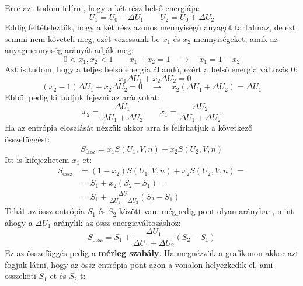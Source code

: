 \documentclass[a4paper,12pt]{article}
\begin{document}
Erre azt tudom felírni, hogy a két rész belső energiája:
\begin{equation}
    U_1 = U_0 - \Delta U_1 \qquad U_2 = U_0 + \Delta U_2
\end{equation}
Eddig feltételeztük, hogy a két rész azonos mennyiségű anyagot tartalmaz, de ezt semmi nem követeli meg, ezét vezessünk be $x_1$ és $x_2$ mennyiségeket, amik az anyagmennyiség arányát adják meg:
\begin{equation}
    0 < x_1, x_2 < 1 \qquad x_1 + x_2 = 1 \quad \rightarrow \quad x_1 = 1 - x_2
\end{equation}
Azt is tudom, hogy a teljes belső energia állandó, ezért a belső energia változás 0:
\begin{equation}
    -x_1 \Delta U_1 + x_2 \Delta U_2 = 0
\end{equation}
\begin{equation}
    (x_2 - 1) \Delta U_1 + x_2 \Delta U_2 = 0 \quad \to \quad x_2 (\Delta U_1 + \Delta U_2) = \Delta U_1
\end{equation}
Ebből pedig ki tudjuk fejezni az arányokat:
\begin{equation}
    x_2 = \frac{\Delta U_1}{\Delta U_1 + \Delta U_2} \qquad x_1 = \frac{\Delta U_2}{\Delta U_1 + \Delta U_2}
\end{equation}
Ha az entrópia eloszlását nézzük akkor arra is felírhatjuk a következő összefüggést:
\begin{equation}
    S_{\text{össz}} = x_1 S(U_1, V, n) + x_2 S(U_2, V, n)
\end{equation}
Itt is kifejezhetem $x_1$-et:
\begin{equation}
    \begin{aligned}
        S_{\text{össz}} &= (1 - x_2) S(U_1, V, n) + x_2 S(U_2, V, n) = \\
        &= S_1 + x_2 \left(S_2 - S_1\right) = \\
        &= S_1 + \frac{\Delta U_1}{\Delta U_1 + \Delta U_2} \left(S_2 - S_1\right)
    \end{aligned}
\end{equation}
Tehát az össz entrópia $S_1$ és $S_2$ között van, mégpedig pont olyan arányban, mint ahogy a $\Delta U_1$ aránylik az össz energiaváltozáshoz:
\begin{equation}
    S_{\text{össz}} = S_1 + \frac{\Delta U_1}{\Delta U_1 + \Delta U_2} \left(S_2 - S_1\right)
\end{equation}
Ez az összefüggés pedig a \textbf{mérleg szabály}. Ha megnézzük a grafikonon akkor azt fogjuk látni, hogy az össz entrópia pont azon a vonalon helyezkedik el, ami összeköti $S_1$-et és $S_2$-t:
\end{document}
